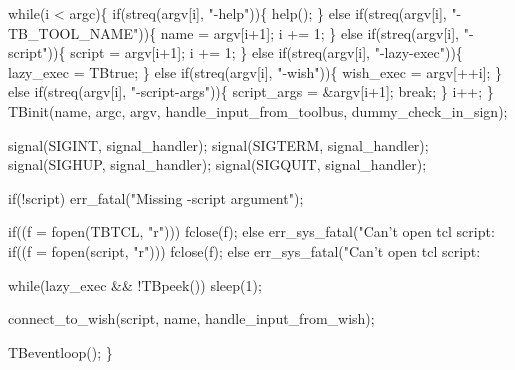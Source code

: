   while(i < argc)\{
    if(streq(argv[i], "-help"))\{
      help();
    \} else if(streq(argv[i], "-TB_TOOL_NAME"))\{
      name = argv[i+1]; i += 1;
    \} else if(streq(argv[i], "-script"))\{
      script = argv[i+1]; i += 1;
    \} else if(streq(argv[i], "-lazy-exec"))\{
      lazy_exec = TBtrue;
    \} else if(streq(argv[i], "-wish"))\{
      wish_exec = argv[++i];
    \} else if(streq(argv[i], "-script-args"))\{
      script_args = &argv[i+1];
      break;
    \}
    i++;
  \}
  TBinit(name, argc, argv, handle_input_from_toolbus, dummy_check_in_sign);

  signal(SIGINT,  signal_handler);
  signal(SIGTERM, signal_handler);
  signal(SIGHUP,  signal_handler);
  signal(SIGQUIT, signal_handler);
 
  if(!script)
    err_fatal("Missing -script argument");

  if((f = fopen(TBTCL, "r")))
    fclose(f);
  else
    err_sys_fatal("Can't open tcl script: %
  if((f = fopen(script, "r")))
    fclose(f);
  else
    err_sys_fatal("Can't open tcl script: %
    
  while(lazy_exec && !TBpeek())
    sleep(1);

  connect_to_wish(script, name, handle_input_from_wish);

  TBeventloop();
\}
\nwendcode{}

%
\nwdocspar
\nwenddocs{}

